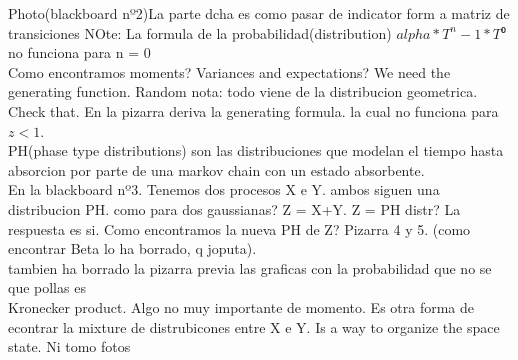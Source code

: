 \documentclass{article}
\begin{document}
Photo(blackboard nº2)La parte dcha es como pasar de indicator form a matriz de transiciones
NOte: La formula de la probabilidad(distribution) $alpha*T^n-1*T⁰$ no funciona para n = 0\\

Como encontramos moments? Variances and expectations? We need the generating function. 
Random nota: todo viene de la distribucion geometrica. Check that. En la pizarra deriva la 
generating formula. la cual no funciona para $z < 1$. \\

PH(phase type distributions) son las distribuciones que modelan el tiempo hasta absorcion por parte de una markov chain con un estado absorbente. \\

En la blackboard nº3. Tenemos dos procesos X e Y. ambos siguen una distribucion PH. como para dos gaussianas? Z = X+Y. Z = PH distr? La respuesta es si. Como encontramos la nueva PH de Z? Pizarra 4 y 5. (como encontrar Beta lo ha borrado, q joputa).\\

tambien ha borrado la pizarra previa las graficas con la probabilidad que no se que pollas es\\

Kronecker product. Algo no muy importante de momento. Es otra forma de econtrar la mixture de distrubicones entre X e Y. Is a way to organize the space state. Ni tomo fotos\\
\end{document}
